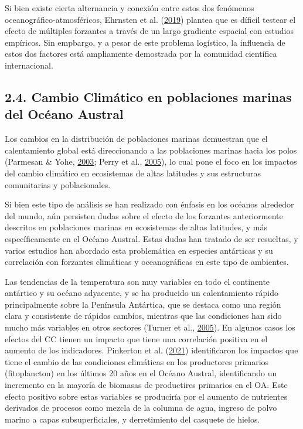 \documentclass[
]{article}
\begin{document}
Si bien existe cierta alternancia y conexión entre estos dos fenómenos
oceanográfico-atmosféricos, Ehrnsten et al.
(\protect\hyperlink{ref-Ehrnsten2019}{2019}) plantea que es díficil
testear el efecto de múltiples forzantes a través de un largo gradiente
espacial con estudios empíricos. Sin empbargo, y a pesar de este
problema logístico, la influencia de estos dos factores está ampliamente
demostrada por la comunidad científica internacional.

\hypertarget{cambio-climuxe1tico-en-poblaciones-marinas-del-ocuxe9ano-austral}{%
\subsection{2.4. Cambio Climático en poblaciones marinas del Océano
Austral}\label{cambio-climuxe1tico-en-poblaciones-marinas-del-ocuxe9ano-austral}}

Los cambios en la distribución de poblaciones marinas demuestran que el
calentamiento global está direccionando a las poblaciones marinas hacia
los polos (Parmesan \& Yohe, \protect\hyperlink{ref-Parmesan2003}{2003};
Perry et al., \protect\hyperlink{ref-Perry2005}{2005}), lo cual pone el
foco en los impactos del cambio climático en ecosistemas de altas
latitudes y sus estructuras comunitarias y poblacionales.

Si bien este tipo de análisis se han realizado con énfasis en los
océanos alrededor del mundo, aún persisten dudas sobre el efecto de los
forzantes anteriormente descritos en poblaciones marinas en ecosistemas
de altas latitudes, y más específicamente en el Océano Austral. Estas
dudas han tratado de ser resueltas, y varios estudios han abordado esta
problemática en especies antárticas y su correlación con forzantes
climáticas y oceanográficas en este tipo de ambientes.

Las tendencias de la temperatura son muy variables en todo el continente
antártico y su océano adyacente, y se ha producido un calentamiento
rápido principalmente sobre la Península Antártica, que se destaca como
una región clara y consistente de rápidos cambios, mientras que las
condiciones han sido mucho más variables en otros sectores (Turner et
al., \protect\hyperlink{ref-Turner2005}{2005}). En algunos casos los
efectos del CC tienen un impacto que tiene una correlación positiva en
el aumento de los indicadores. Pinkerton et al.
(\protect\hyperlink{ref-Pinkerton2021}{2021}) identificaron los impactos
que tiene el cambio de las condiciones climáticas en los productores
primarios (fitoplancton) en los últimos 20 años en el Océano Austral,
identificando un incremento en la mayoría de biomasas de productires
primarios en el OA. Este efecto positivo sobre estas variables se
produciría por el aumento de nutrientes derivados de procesos como
mezcla de la columna de agua, ingreso de polvo marino a capas
subsuperficiales, y derretimiento del casquete de hielos.
\end{document}
